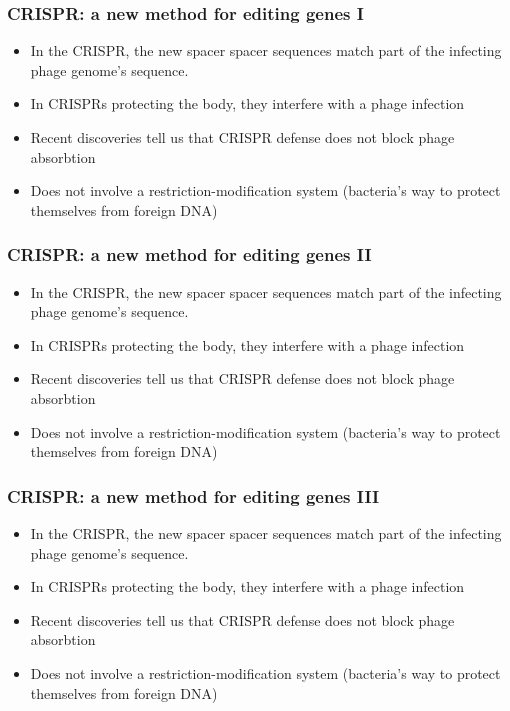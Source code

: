 \documentclass{beamer}
\begin{document}
\begin{frame}
\frametitle{CRISPR: a new method for editing genes I}
\begin{itemize}
\item
In the CRISPR, the new spacer spacer sequences match part of the infecting phage genome’s sequence.
\item In CRISPRs protecting the body, they interfere with a phage infection
\item  Recent discoveries tell us that CRISPR defense does not block phage absorbtion
\item Does not involve a restriction-modification system (bacteria’s way to protect themselves from foreign DNA)
\end{itemize}
\end{frame}

\begin{frame}
\frametitle{CRISPR: a new method for editing genes II}
\begin{itemize}
\item
In the CRISPR, the new spacer spacer sequences match part of the infecting phage genome’s sequence.
\item In CRISPRs protecting the body, they interfere with a phage infection
\item  Recent discoveries tell us that CRISPR defense does not block phage absorbtion
\item Does not involve a restriction-modification system (bacteria’s way to protect themselves from foreign DNA)
\end{itemize}
\end{frame}

\begin{frame}
\frametitle{CRISPR: a new method for editing genes III}
\begin{itemize}
\item
In the CRISPR, the new spacer spacer sequences match part of the infecting phage genome’s sequence.
\item In CRISPRs protecting the body, they interfere with a phage infection
\item  Recent discoveries tell us that CRISPR defense does not block phage absorbtion
\item Does not involve a restriction-modification system (bacteria’s way to protect themselves from foreign DNA)
\end{itemize}
\end{frame}
\end{document}

